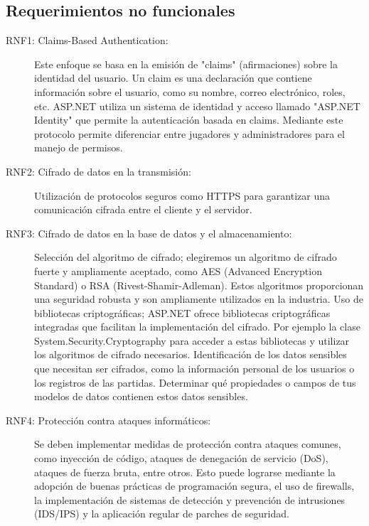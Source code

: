 \documentclass[a4paper]{article}
\begin{document}
\subsection{Requerimientos no funcionales}
\begin{description}
    \item[RNF1: Claims-Based Authentication:] Este enfoque se basa en la emisión de "claims" (afirmaciones) sobre la identidad del usuario. Un claim es una declaración que contiene informaci\'on sobre el usuario, como su nombre, correo electrónico, roles, etc. ASP.NET utiliza un sistema de identidad y acceso llamado "ASP.NET Identity" que permite la autenticaci\'on basada en claims. Mediante este protocolo permite diferenciar entre jugadores y administradores para el manejo de permisos.
    \item[RNF2: Cifrado de datos en la transmisi\'on:] Utilizaci\'on de protocolos seguros como HTTPS para garantizar una comunicación cifrada entre el cliente y el servidor.
    \item[RNF3: Cifrado de datos en la base de datos y el almacenamiento:] Selección del algoritmo de cifrado; elegiremos un algoritmo de cifrado fuerte y ampliamente aceptado, como AES (Advanced Encryption Standard) o RSA (Rivest-Shamir-Adleman). Estos algoritmos proporcionan una seguridad robusta y son ampliamente utilizados en la industria. Uso de bibliotecas criptogr\'aficas; ASP.NET ofrece bibliotecas criptogr\'aficas integradas que facilitan la implementaci\'on del cifrado. Por ejemplo la clase System.Security.Cryptography para acceder a estas bibliotecas y utilizar los algoritmos de cifrado necesarios. Identificaci\'on de los datos sensibles que necesitan ser cifrados, como la información personal de los usuarios o los registros de las partidas. Determinar qu\'e propiedades o campos de tus modelos de datos contienen estos datos sensibles.
    \item[RNF4: Protecci\'on contra ataques inform\'aticos:] Se deben implementar medidas de protecci\'on contra ataques comunes, como inyecci\'on de código, ataques de denegaci\'on de servicio (DoS), ataques de fuerza bruta, entre otros. Esto puede lograrse mediante la adopci\'on de buenas pr\'acticas de programaci\'on segura, el uso de firewalls, la implementaci\'on de sistemas de detecci\'on y prevención de intrusiones (IDS/IPS) y la aplicación regular de parches de seguridad.
    

\end{description}
\end{document}
